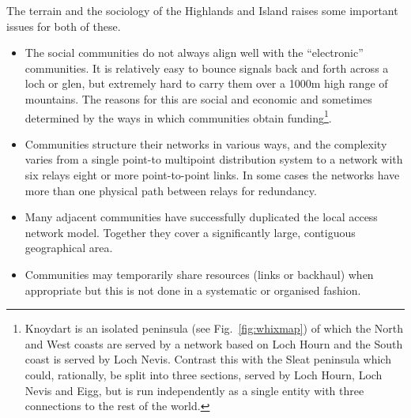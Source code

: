 The terrain and the sociology of the Highlands and Island raises some important issues for both of these.
\begin{itemize}
\item The social communities do not always align well with the ``electronic'' communities. It is relatively easy to bounce signals back and forth across a loch or glen, but extremely hard to carry them over a 1000m high range of mountains. The reasons for this are social and economic and sometimes determined by the ways in which communities obtain funding\footnote{Knoydart is an isolated peninsula (see Fig.~\ref{fig:whixmap})  of which the North and West coasts are served by a network based on Loch Hourn and the South coast is served by Loch Nevis.  Contrast this with the Sleat peninsula which could, rationally,  be split into three sections, served by Loch Hourn, Loch Nevis and Eigg, but is run independently as a single entity with three connections to the rest of the world.}.
\item Communities structure their networks in various ways, and the complexity varies from a single point-to multipoint distribution system to a network with six relays  eight or more point-to-point links.  In some cases the networks have more than one physical path between relays for redundancy.
\item Many adjacent communities have successfully duplicated the local access network model. Together they cover a significantly large, contiguous geographical area.
\item Communities may temporarily share resources (links or backhaul) when appropriate but this is not done in a systematic or organised fashion.
\end{itemize}

